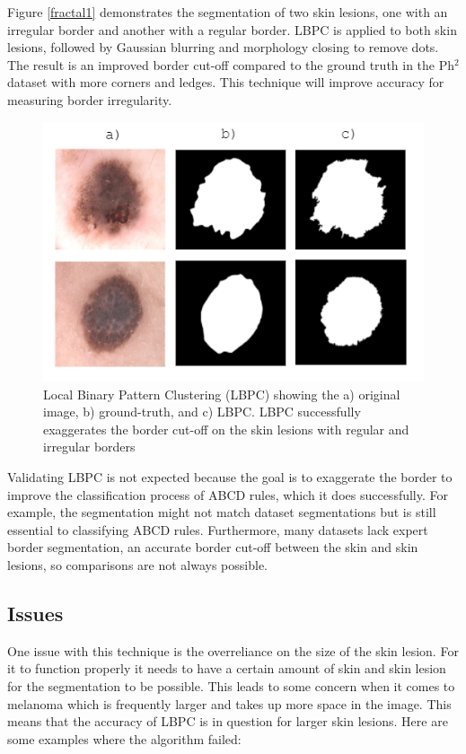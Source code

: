 Figure \ref{fractal1} demonstrates the segmentation of two skin lesions, one with an irregular border and another with a regular border. LBPC is applied to both skin lesions, followed by Gaussian blurring and morphology closing to remove dots. The result is an improved border cut-off compared to the ground truth in the Ph$^2$ dataset with more corners and ledges. This technique will improve accuracy for measuring border irregularity\cite{Pereira2020}.

\begin{figure}
\centering
\includegraphics[scale=1.2]{images/borders.PNG}
\caption{Local Binary Pattern Clustering (LBPC) showing the a) original image, b) ground-truth, and c) LBPC. LBPC successfully exaggerates the border cut-off on the skin lesions with regular and irregular borders} 
\end{figure}\label{fractal1}

Validating LBPC is not expected because the goal is to exaggerate the border to improve the classification process of ABCD rules, which it does successfully\cite{Pereira2020, Kaya2016}. For example, the segmentation might not match dataset segmentations but is still essential to classifying ABCD rules. Furthermore, many datasets lack expert border segmentation, an accurate border cut-off between the skin and skin lesions, so comparisons are not always possible.

\subsection{Issues}
One issue with this technique is the overreliance on the size of the skin lesion. For it to function properly it needs to have a certain amount of skin and skin lesion for the segmentation to be possible. This leads to some concern when it comes to melanoma which is frequently larger and takes up more space in the image. This means that the accuracy of LBPC is in question for larger skin lesions. Here are some examples where the algorithm failed:

